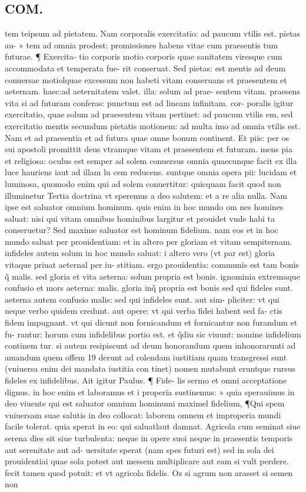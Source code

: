 \documentclass{article}
\begin{document}
\begin{pages}
\section*{COM. }
\marginpar{[ p.4 ]}\pstart tem teipsum ad pietatem. Nam corporalis exercitatio: ad paucum vtilis est. pietas au- » tem ad omnia prodest: promissiones habens vitae cum praesentis tum futurae. ¶ Exercita- tio corporis motio corporis quae sanitatem viresque cum accommodata et temperata fue- rit conseruat. Sed pietas: est mentis ad deum conuersae motiolquae excessum non habeti vitam conseruans et praesentem et aeternam. haec:ad aeternitatem valet. illa: solum ad prae- sentem vitam. praesens vita si ad futuram conferas: punctum est ad lineam infinitam. cor- poralis igitur exercitatio, quae solum ad praesentem vitam pertinet: ad paucum vtilis em, sed exercitatio mentis secundum pietatis motionem: ad multa imo ad omnia vtilis est. Nam et ad praesentia et ad futura quae omne bonum continent. Et piis: per os sui apostoli promittit deus vtramque vitam et praesentem et futuram. mens pia et religiosa: oculus est semper ad solem conuersus omnia quaecunque facit ex illa luce hauriens iaut ad illam lu cem reducens. suntque omnia opera pii: lucidam et luminosa, quomodo enim qui ad solem conuertitur: quicquam facit quod non illuminetur Tertia doctrina vt speremus a deo salutem: et a re alia nulla. Nam ipse est saluator omnium hominum. quis enim in hoc mundo om nes homines saluat: nisi qui vitam omnibus hominibus largitur et prouidet vnde habi ta conseruetur? Sed maxime saluator est hominum fidelium. nam eos et in hoc mundo saluat per prouidentiam: et in altero per gloriam et vitam sempiternam. infideles autem solum in hoc mundo saluat: i altero vero (vt par est) gloria vitaque priuat aeternal per iu- stitiam. ergo prouidentia: communis est tam bonis q̃ malis. sed gloria et vita aeterna: solum propria est bonis. ignominia extremaque confusio et mors aeterna: malis. gloria inq̃ propria est bonis sed qui fideles sunt. aeterna autem confusio malis: sed qui infideles sunt. aut sim- pliciter: vt qui neque verbo quidem credunt. aut opere: vt qui verba fidei habent sed fa- ctis fidem impugnant. vt qui dicunt non fornicandum et fornicantur non furandum et fu- rantur: horum cum infidelibus portio est. et q̃diu sic viuunt: nomine infidelium continem tur. si autem resipiscunt ad deum honorandum quem inhonorarunti ad amandum quem offem 19 derunt ad colendam iustitiam quam transgressi sunt (vniuersa enim dei mandata iustitia con tinet) nomen mutabunt eruntque rursus fideles ex infidelibus. Ait igitur Paulus. ¶ Fide-  lis sermo et omni acceptatione dignus. in hoc enim et laboramus et i properia sustinemus: » quia sperauimus in deo viuente qui est saluator omnium hominumi maximel fidelium, ¶Qui spem vniuersam suae salutis in deo collocat: laborem omnem et improperia mundi facile tolerat. quia sperat in eo: qui saluatlaut damnat. Agricola cum seminat siue serena dies sit siue turbulenta: neque in opere suoi neque in praesentis temporis aut serenitate aut ad- uersitate sperat (nam spes futuri est) sed in sola dei prouidentiai quae sola potest aut messem multiplicare aut eam si vult perdere. fecit tamen quod potuit: et vt agricola fidelis. Oz si agrum non arasset si semen non 
\end{pages}
\end{document}
